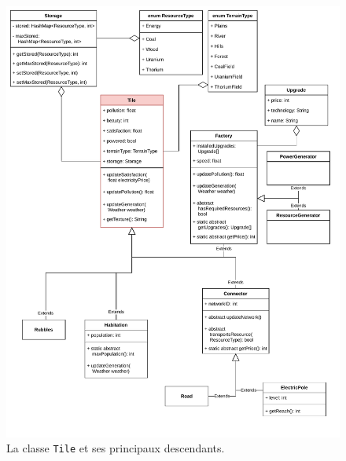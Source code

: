 \documentclass[12pt]{article}
\begin{document}
\begin{figure}[H]
\includegraphics[width=\textwidth]{uml-classes-Page-3}
\caption{La classe \texttt{Tile} et ses principaux descendants.\label{fig:tile}}
\end{figure}
\end{document}
